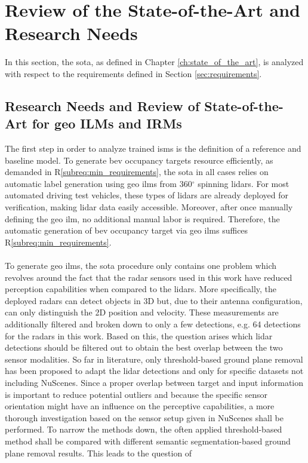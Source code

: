 \section{Review of the State-of-the-Art and Research Needs}
\label{sec:research_needs}
In this section, the \gls{sota}, as defined in Chapter \ref{ch:state_of_the_art}, is analyzed with respect to the requirements defined in Section \ref{sec:requirements}.
%
\subsection{Research Needs and Review of State-of-the-Art for geo ILMs and IRMs}
\label{subsec:research_needs_for_geo_ilms_n_irms}
The first step in order to analyze trained \gls{ism}s is the definition of a reference and baseline model. To generate \gls{bev} occupancy targets resource efficiently, as demanded in R\ref{subreq:min_requirements}, the \gls{sota} in all cases relies on automatic label generation using geo \gls{ilm}s from 360$^\circ$ spinning lidars. For most automated driving test vehicles, these types of lidars are already deployed for verification, making lidar data easily accessible. Moreover, after once manually defining the geo \gls{ilm}, no additional manual labor is required. Therefore, the automatic generation of \gls{bev} occupancy target via geo \gls{ilm}s suffices R\ref{subreq:min_requirements}.
\\\\
To generate geo \gls{ilm}s, the \gls{sota} procedure only contains one problem which revolves around the fact that the radar sensors used in this work have reduced perception capabilities when compared to the lidars. More specifically, the deployed radars can detect objects in 3D but, due to their antenna configuration, can only distinguish the 2D position and velocity. These measurements are additionally filtered and broken down to only a few detections, e.g. 64 detections for the radars in this work. Based on this, the question arises which lidar detections should be filtered out to obtain the best overlap between the two sensor modalities. So far in literature, only threshold-based ground plane removal has been proposed to adapt the lidar detections and only for specific datasets not including NuScenes. Since a proper overlap between target and input information is important to reduce potential outliers and because the specific sensor orientation might have an influence on the perceptive capabilities, a more thorough investigation based on the sensor setup given in NuScenes shall be performed. To narrow the methods down, the often applied threshold-based method shall be compared with different semantic segmentation-based ground plane removal results. This leads to the question of
